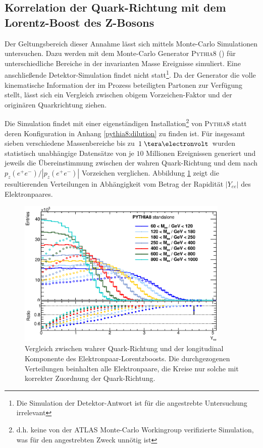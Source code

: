 \subsection{Korrelation der Quark-Richtung mit dem Lorentz-Boost des Z-Bosons}
\label{afb:dilution}
Der Geltungsbereich dieser Annahme lässt sich mittels Monte-Carlo Simulationen
untersuchen. Dazu werden mit dem Monte-Carlo Generator \textsc{Pythia8}
(\cite{Sjostrand:2007gs}) für unterschiedliche Bereiche in der invarianten
Masse Ereignisse simuliert. Eine anschließende Detektor-Simulation findet nicht
statt\footnote{Die Simulation der Detektor-Antwort ist für die angestrebte
Untersuchung irrelevant}. Da der Generator die volle kinematische Information
der im Prozess beteiligten Partonen zur Verfügung stellt, lässt sich ein
Vergleich zwischen obigem Vorzeichen-Faktor und der originären Quarkrichtung
ziehen.

Die Simulation findet mit einer eigenständigen Installation\footnote{d.h. keine
von der ATLAS Monte-Carlo Workingroup verifizierte Simulation, was für den
angestrebten Zweck unnötig ist} von \textsc{Pythia8} statt deren
Konfiguration in Anhang \ref{pythia8:dilution} zu finden ist. Für insgesamt
sieben verschiedene Massenbereiche bis zu $1 \TeV$ wurden statistisch
unabhängige Datensätze von je $10$ Millionen Ereignissen generiert und jeweils
die Übereinstimmung zwischen der wahren Quark-Richtung und dem nach
$p_z(e^+e^-)/|p_z(e^+e^-)|$ Vorzeichen verglichen. Abbildung \ref{fig:dilution}
zeigt die resultierenden Verteilungen in Abhängigkeit vom Betrag der Rapidität
$|Y_{ee}|$ des Elektronpaares.

\begin{figure}[h]
    \centering
    \includegraphics[width=0.9\textwidth]{plots/dilution}
    \caption[Vergleich zwischen Quark-Richtung und long. Komponente des
        Z-Boosts]
        {Vergleich zwischen wahrer Quark-Richtung und der longitudinal
        Komponente des Elektronpaar-Lorentzboosts. Die durchgezogenen
        Verteilungen beinhalten alle Elektronpaare, die Kreise nur solche mit
        korrekter Zuordnung der Quark-Richtung.}
    \label{fig:dilution}
\end{figure}

